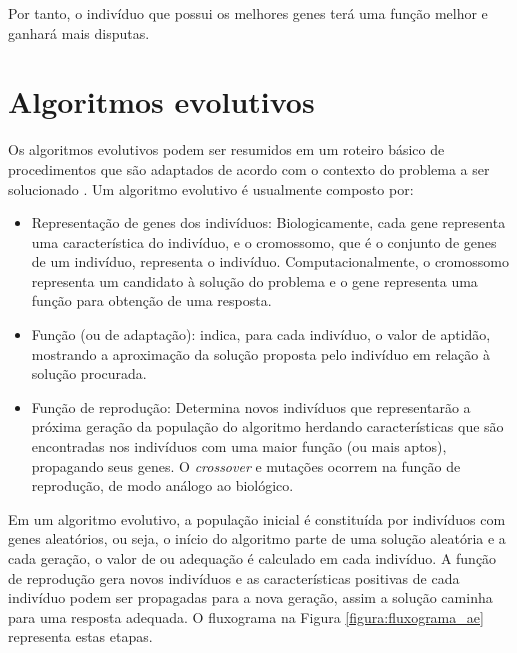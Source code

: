 Por tanto, o indivíduo que possui os melhores genes terá uma função \fitness melhor e ganhará mais disputas.

\section{Algoritmos evolutivos}
Os algoritmos evolutivos podem ser resumidos em um roteiro básico de procedimentos \cite{Todd1997} que são adaptados de acordo com o contexto do problema a ser solucionado \cite{Werger1999} \cite{Mitchell1995}. Um algoritmo evolutivo é usualmente composto por:

\newcommand{\crossover}{\textit{crossover}\xspace}

\begin{itemize}
    \item Representação de genes dos indivíduos: Biologicamente, cada gene representa uma característica do indivíduo, e o cromossomo, que é o conjunto de genes de um indivíduo, representa o indivíduo. Computacionalmente, o cromossomo representa um candidato à solução do problema e o gene representa uma função para obtenção de uma resposta.
    \item Função \fitness (ou de adaptação): indica, para cada indivíduo, o valor de aptidão, mostrando a aproximação da solução proposta pelo indivíduo em relação à solução procurada.
    \item Função de reprodução: Determina novos indivíduos que representarão a próxima geração da população do algoritmo herdando características que são encontradas nos indivíduos com uma maior função \fitness (ou mais aptos), propagando seus genes. O \crossover e mutações ocorrem na função de reprodução, de modo análogo ao biológico.
\end{itemize}

Em um algoritmo evolutivo, a população inicial é constituída por indivíduos com genes aleatórios, ou seja, o início do algoritmo parte de uma solução aleatória e a cada geração, o valor de \fitness ou adequação é calculado em cada indivíduo. A função de reprodução gera novos indivíduos e as características positivas de cada indivíduo podem ser propagadas para a nova geração, assim a solução caminha para uma resposta adequada. O fluxograma na Figura \ref{figura:fluxograma_ae} representa estas etapas.

